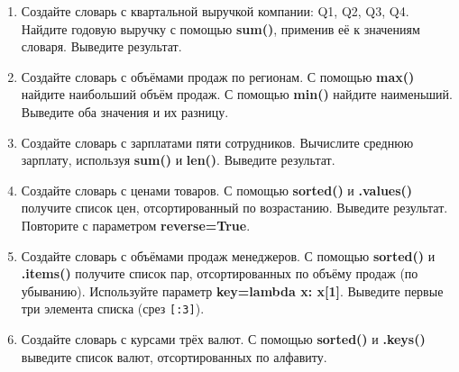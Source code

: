 \documentclass[a4,12pt]{article}
\theoremstyle{remark}
\begin{document}
\begin{enumerate}[resume]

    \item Создайте словарь с квартальной выручкой компании: Q1, Q2, Q3, Q4. Найдите годовую выручку с помощью \textbf{sum()}, применив её к значениям словаря. Выведите результат.

    \item Создайте словарь с объёмами продаж по регионам. С помощью \textbf{max()} найдите наибольший объём продаж. С помощью \textbf{min()} найдите наименьший. Выведите оба значения и их разницу.

    \item Создайте словарь с зарплатами пяти сотрудников. Вычислите среднюю зарплату, используя \textbf{sum()} и \textbf{len()}. Выведите результат.

    \item Создайте словарь с ценами товаров. С помощью \textbf{sorted()} и \textbf{.values()} получите список цен, отсортированный по возрастанию. Выведите результат. Повторите с параметром \textbf{reverse=True}.

    \item Создайте словарь с объёмами продаж менеджеров. С помощью \textbf{sorted()} и \textbf{.items()} получите список пар, отсортированных по объёму продаж (по убыванию). Используйте параметр \textbf{key=lambda x: x[1]}. Выведите первые три элемента списка (срез \texttt{[:3]}).

    \item Создайте словарь с курсами трёх валют. С помощью \textbf{sorted()} и \textbf{.keys()} выведите список валют, отсортированных по алфавиту.

\end{enumerate}
\end{document}
